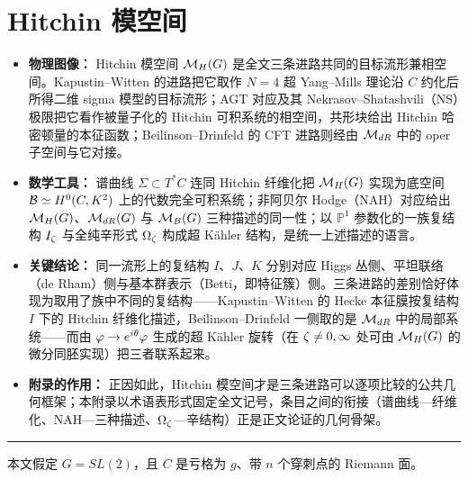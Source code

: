 \providecommand{\BC}{\mathbb{C}}

\section{Hitchin 模空间}\label{Gloss}

\begin{keytakeaways}
\begin{itemize}
  \item \textbf{物理图像：} Hitchin 模空间 $\mathcal{M}_H(G)$ 是全文三条进路共同的目标流形兼相空间。Kapustin--Witten 的进路把它取作 $N=4$ 超 Yang--Mills 理论沿 $C$ 约化后所得二维 sigma 模型的目标流形；AGT 对应及其 Nekrasov--Shatashvili（NS）极限把它看作被量子化的 Hitchin 可积系统的相空间，共形块给出 Hitchin 哈密顿量的本征函数；Beilinson--Drinfeld 的 CFT 进路则经由 $\mathcal{M}_{dR}$ 中的 oper 子空间与它对接。
  \item \textbf{数学工具：} 谱曲线 $\Sigma\subset T^*C$ 连同 Hitchin 纤维化把 $\mathcal{M}_H(G)$ 实现为底空间 $\mathcal{B}\simeq H^0(C,K^2)$ 上的代数完全可积系统；非阿贝尔 Hodge（NAH）对应给出 $\mathcal{M}_H(G)$、$\mathcal{M}_{dR}(G)$ 与 $\mathcal{M}_B(G)$ 三种描述的同一性；以 $\mathbb{P}^1$ 参数化的一族复结构 $I_\zeta$ 与全纯辛形式 $\Omega_\zeta$ 构成超 K\"ahler 结构，是统一上述描述的语言。
  \item \textbf{关键结论：} 同一流形上的复结构 $I$、$J$、$K$ 分别对应 Higgs 丛侧、平坦联络（de Rham）侧与基本群表示（Betti，即特征簇）侧。三条进路的差别恰好体现为取用了族中不同的复结构——Kapustin--Witten 的 Hecke 本征膜按复结构 $I$ 下的 Hitchin 纤维化描述，Beilinson--Drinfeld 一侧取的是 $\mathcal{M}_{dR}$ 中的局部系统——而由 $\varphi\to e^{i\theta}\varphi$ 生成的超 K\"ahler 旋转（在 $\zeta\neq0,\infty$ 处可由 $\mathcal{M}_H(G)$ 的微分同胚实现）把三者联系起来。
  \item \textbf{附录的作用：} 正因如此，Hitchin 模空间才是三条进路可以逐项比较的公共几何框架；本附录以术语表形式固定全文记号，条目之间的衔接（谱曲线—纤维化、NAH—三种描述、$\Omega_\zeta$—辛结构）正是正文论证的几何骨架。
\end{itemize}
\end{keytakeaways}

\bigskip
\noindent\rule{\textwidth}{0.6pt}
\bigskip

本文假定 $G=SL(2)$，且 $C$ 是亏格为 $g$、带 $n$ 个穿刺点的 Riemann 面。

